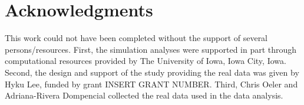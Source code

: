 \documentclass[10pt,letterpaper]{article}
\begin{document}





\section*{Acknowledgments}
This work could not have been completed without the support of several persons/resources.
First, the simulation analyses were supported in part through computational resources provided by The University of Iowa, Iowa City, Iowa.
Second, the design and support of the study providing the real data was given by Hyku Lee, funded by grant INSERT GRANT NUMBER.
Third, Chris Oeler and Adriana-Rivera Dompencial collected the real data used in the data analysis.
\end{document}
